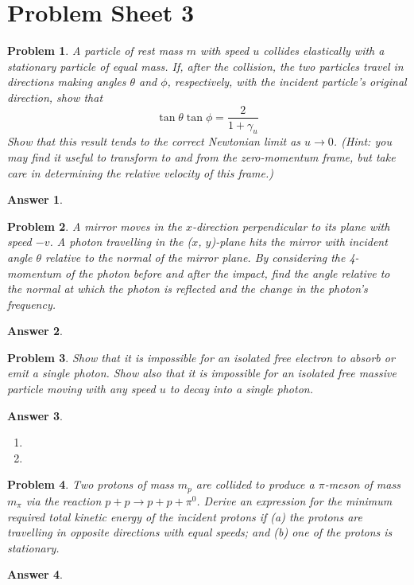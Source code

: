 \documentclass[a4paper]{article}
\newtheorem{ans}{Answer}[subsection]
\theoremstyle{new}
\newtheorem{qns}{Problem}[section]
\begin{document}
\section{Problem Sheet 3}
\begin{qns}\leavevmode
A particle of rest mass $m$ with speed $u$ collides elastically with a stationary particle of equal mass. If, after the collision, the two particles travel in directions making angles $\theta$ and $\phi$, respectively, with the incident particle’s original direction, show that
$$\tan\theta\tan\phi=\frac{2}{1+\gamma_u}$$
Show that this result tends to the correct Newtonian limit as $u\rightarrow0$. (Hint: you may find it useful to transform to and from the zero-momentum frame, but take care in determining the relative velocity of this frame.)
\end{qns}
\begin{ans}
\end{ans}
\begin{qns}
A mirror moves in the $x$-direction perpendicular to its plane with speed $−v$. A photon travelling in the ($x$, $y$)-plane hits the mirror with incident angle $\theta$ relative to the normal of the mirror plane. By considering the 4-momentum of the photon before and after the impact, find the angle relative to the normal at which the photon is reflected and the change in the photon’s frequency.
\end{qns}
\begin{ans}

\end{ans}
\newpage
\begin{qns}
Show that it is impossible for an isolated free electron to absorb or emit a single photon. Show also that it is impossible for an isolated free massive particle moving with any speed $u$ to decay into a single photon.
\end{qns}
\begin{ans}\leavevmode
\begin{enumerate}[label=(\alph*)]
\item

\item 
\end{enumerate}
\end{ans}
\begin{qns}
Two protons of mass $m_p$ are collided to produce a $\pi$-meson of mass $m_\pi$ via the reaction  $p+p\rightarrow p+p+\pi^0$. Derive an expression for the minimum required total kinetic energy of the incident protons if (a) the protons are travelling in opposite directions with equal speeds; and (b) one of the protons is stationary.
\end{qns}
\begin{ans}

\end{ans}
\newpage
\end{document}
